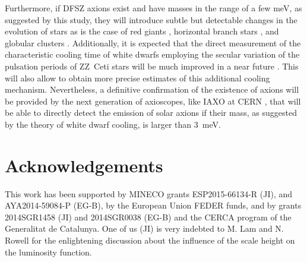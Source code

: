 \documentclass[useAMS,usenatbib]{mnras}
\begin{document}
Furthermore, if  DFSZ axions exist and  have masses in  the range of  a few
meV,  as suggested  by  this  study, they  will  introduce subtle  but
detectable changes  in the evolution  of stars as  is the case  of red
giants  \citep{viau13},  horizontal branch  stars  \citep{ayal14}, and globular clusters \citep{hans15,gold12,gold16}.
Additionally,  it  is expected  that  the  direct measurement  of  the
characteristic  cooling time  of  white dwarfs  employing the  secular
variation  of the  pulsation periods  of  ZZ~Ceti stars  will be  much
improved  in a  near future  \citep{cors12,cors12a,cors16}. This  will
also allow to obtain more precise estimates of this additional cooling
mechanism. Nevertheless, a definitive confirmation of the existence of
axions will  be provided  by the next  generation of  axioscopes, like
IAXO at CERN \citep{arme14}, that will  be able to directly detect the
emission of solar axions if their  mass, as suggested by the theory of
white dwarf cooling, is larger than 3~meV.
   
\section*{Acknowledgements}
This work  has been supported  by MINECO grants  ESP2015-66134-R (JI),
and AYA2014-59084-P (EG-B), by the  European Union FEDER funds, and by
grants 2014SGR1458 (JI)  and 2014SGR0038 (EG-B) and the CERCA program
 of  the Generalitat de Catalunya. One of us (JI) is very indebted to M. Lam and N. Rowell for the enlightening discussion about the influence of the scale height on the luminosity function.

 

\end{document}
